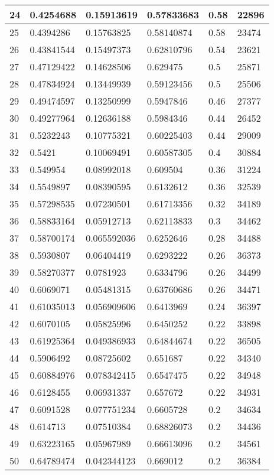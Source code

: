 \begin{longtable}{|l|l|l|l|l|l|}
24 & 0.4254688 & 0.15913619 & 0.57833683 & 0.58 & 22896 \\ \hline 
25 & 0.4394286 & 0.15763825 & 0.58140874 & 0.58 & 23474 \\ \hline 
26 & 0.43841544 & 0.15497373 & 0.62810796 & 0.54 & 23621 \\ \hline 
27 & 0.47129422 & 0.14628506 & 0.629475 & 0.5 & 25871 \\ \hline 
28 & 0.47834924 & 0.13449939 & 0.59123456 & 0.5 & 25506 \\ \hline 
29 & 0.49474597 & 0.13250999 & 0.5947846 & 0.46 & 27377 \\ \hline 
30 & 0.49277964 & 0.12636188 & 0.5984346 & 0.44 & 26452 \\ \hline 
31 & 0.5232243 & 0.10775321 & 0.60225403 & 0.44 & 29009 \\ \hline 
32 & 0.5421 & 0.10069491 & 0.60587305 & 0.4 & 30884 \\ \hline 
33 & 0.549954 & 0.08992018 & 0.609504 & 0.36 & 31224 \\ \hline 
34 & 0.5549897 & 0.08390595 & 0.6132612 & 0.36 & 32539 \\ \hline 
35 & 0.57298535 & 0.07230501 & 0.61713356 & 0.32 & 34189 \\ \hline 
36 & 0.58833164 & 0.05912713 & 0.62113833 & 0.3 & 34462 \\ \hline 
37 & 0.58700174 & 0.065592036 & 0.6252646 & 0.28 & 34488 \\ \hline 
38 & 0.5930807 & 0.06404419 & 0.6293222 & 0.26 & 36373 \\ \hline 
39 & 0.58270377 & 0.0781923 & 0.6334796 & 0.26 & 34499 \\ \hline 
40 & 0.6069071 & 0.05481315 & 0.63760686 & 0.26 & 34471 \\ \hline 
41 & 0.61035013 & 0.056909606 & 0.6413969 & 0.24 & 36397 \\ \hline 
42 & 0.6070105 & 0.05825996 & 0.6450252 & 0.22 & 33898 \\ \hline 
43 & 0.61925364 & 0.049386933 & 0.64844674 & 0.22 & 36505 \\ \hline 
44 & 0.5906492 & 0.08725602 & 0.651687 & 0.22 & 34340 \\ \hline 
45 & 0.60884976 & 0.078342415 & 0.6547475 & 0.22 & 34948 \\ \hline 
46 & 0.6128455 & 0.06931337 & 0.657672 & 0.22 & 34931 \\ \hline 
47 & 0.6091528 & 0.077751234 & 0.6605728 & 0.2 & 34634 \\ \hline 
48 & 0.614713 & 0.07510384 & 0.68826073 & 0.2 & 34436 \\ \hline 
49 & 0.63223165 & 0.05967989 & 0.66613096 & 0.2 & 34561 \\ \hline 
50 & 0.64789474 & 0.042344123 & 0.669012 & 0.2 & 36384 \\ \hline 
\end{longtable}